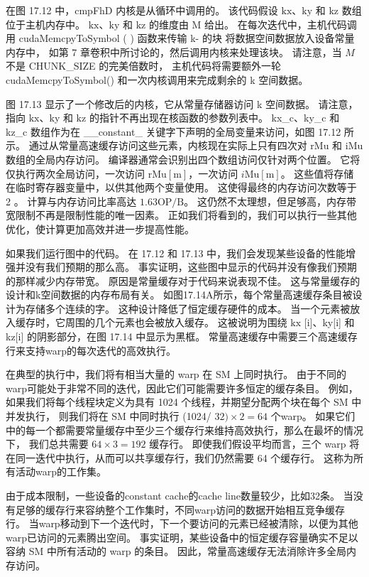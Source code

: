 在图 17.12 中，cmpFhD 内核是从循环中调用的。 
该代码假设 $\mathrm{kx}、\mathrm{ky}$ 和 $\mathrm{kz}$ 数组位于主机内存中。 
$\mathrm{kx}、\mathrm{ky}$ 和 $\mathrm{kz}$ 的维度由 M 给出。
在每次迭代中，主机代码调用 cudaMemcpyToSymbol ( ) 函数来传输 k- 的块 将数据空间数据放入设备常量内存中，
如第 7 章卷积中所讨论的，然后调用内核来处理该块。 
请注意，当 $M$ 不是 CHUNK\_SIZE 的完美倍数时，
主机代码将需要额外一轮 cudaMemcpyToSymbol() 和一次内核调用来完成剩余的 k 空间数据。

图 17.13 显示了一个修改后的内核，它从常量存储器访问 k 空间数据。 
请注意，指向 $\mathrm{kx}$、ky 和 $\mathrm{kz}$ 的指针不再出现在核函数的参数列表中。 
kx\_c、ky\_c 和 kz\_c 数组作为在 \_\_constant\_ 关键字下声明的全局变量来访问，如图 17.12 所示。 
通过从常量高速缓存访问这些元素，内核现在实际上只有四次对 rMu 和 iMu 数组的全局内存访问。 
编译器通常会识别出四个数组访问仅针对两个位置。 
它将仅执行两次全局访问，一次访问 $\mathrm{rMu}[\mathrm{m}]$，一次访问 $i \mathrm{Mu}[\mathrm{m}]$。 
这些值将存储在临时寄存器变量中，以供其他两个变量使用。 这使得最终的内存访问次数等于 2 。 
计算与内存访问比率高达 $1.63 \mathrm{OP} / \mathrm{B}$。 
这仍然不太理想，但足够高，内存带宽限制不再是限制性能的唯一因素。 
正如我们将看到的，我们可以执行一些其他优化，使计算更加高效并进一步提高性能。

如果我们运行图中的代码。 在 17.12 和 17.13 中，我们会发现某些设备的性能增强并没有我们预期的那么高。 
事实证明，这些图中显示的代码并没有像我们预期的那样减少内存带宽。 原因是常量缓存对于代码来说表现不佳。 
这与常量缓存的设计和k空间数据的内存布局有关。 如图17.14A所示，每个常量高速缓存条目被设计为存储多个连续的字。 
这种设计降低了恒定缓存硬件的成本。 当一个元素被放入缓存时，它周围的几个元素也会被放入缓存。 
这被说明为围绕 $\mathrm{kx}$ [i]、ky[i] 和 kz[i] 的阴影部分，在图 17.14 中显示为黑框。 
常量高速缓存中需要三个高速缓存行来支持warp的每次迭代的高效执行。

在典型的执行中，我们将有相当大量的 warp 在 SM 上同时执行。 
由于不同的warp可能处于非常不同的迭代，因此它们可能需要许多恒定的缓存条目。 
例如，如果我们将每个线程块定义为具有 1024 个线程，并期望分配两个块在每个 SM 中并发执行，
则我们将在 SM 中同时执行 (1024/ $32) \times 2=64$ 个warp。 
如果它们中的每一个都需要常量缓存中至少三个缓存行来维持高效执行，那么在最坏的情况下，
我们总共需要 $64 \times 3=192$ 缓存行。 
即使我们假设平均而言，三个 warp 将在同一迭代中执行，从而可以共享缓存行，我们仍然需要 64 个缓存行。 
这称为所有活动warp的工作集。

由于成本限制，一些设备的constant cache的cache line数量较少，比如32条。 
当没有足够的缓存行来容纳整个工作集时，不同warp访问的数据开始相互竞争缓存行。 
当warp移动到下一个迭代时，下一个要访问的元素已经被清除，以便为其他warp已访问的元素腾出空间。 
事实证明，某些设备中的恒定缓存容量确实不足以容纳 SM 中所有活动的 warp 的条目。 
因此，常量高速缓存无法消除许多全局内存访问。

